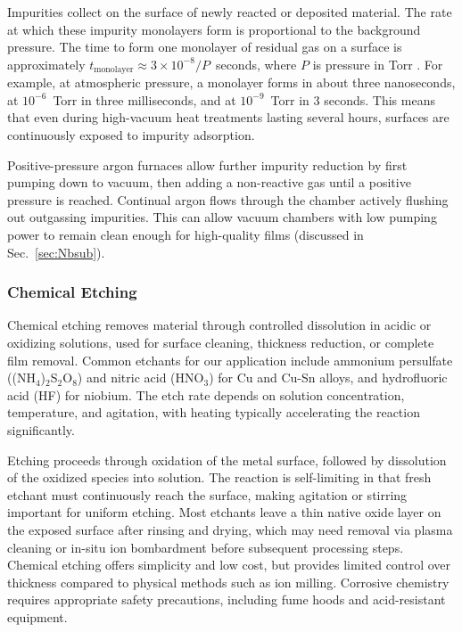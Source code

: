     Impurities collect on the surface of newly reacted or deposited material. The rate at which these impurity monolayers form is proportional to the background pressure. The time to form one monolayer of residual gas on a surface is approximately $t_\text{{monolayer}} \approx 3 \times 10^{-8}/P$~seconds, where $P$ is pressure in Torr \cite{ohringMaterialsScienceThin2002}. For example, at atmospheric pressure, a monolayer forms in about three nanoseconds, at $10^{-6}$~Torr in three milliseconds, and at $10^{-9}$~Torr in 3 seconds. This means that even during high-vacuum heat treatments lasting several hours, surfaces are continuously exposed to impurity adsorption. 
    
    Positive-pressure argon furnaces allow further impurity reduction by first pumping down to vacuum, then adding a non-reactive gas until a positive pressure is reached. Continual argon flows through the chamber actively flushing out outgassing impurities. This can allow vacuum chambers with low pumping power to remain clean enough for high-quality films (discussed in Sec.~\ref{sec:Nbsub}).
    
    \subsubsection{Chemical Etching}
    
    Chemical etching removes material through controlled dissolution in acidic or oxidizing solutions, used for surface cleaning, thickness reduction, or complete film removal. Common etchants for our application include ammonium persulfate ((NH$_4$)$_2$S$_2$O$_8$) and nitric acid (HNO$_3$) for Cu and Cu-Sn alloys, and hydrofluoric acid (HF) for niobium. The etch rate depends on solution concentration, temperature, and agitation, with heating typically accelerating the reaction significantly. 
    
    Etching proceeds through oxidation of the metal surface, followed by dissolution of the oxidized species into solution. The reaction is self-limiting in that fresh etchant must continuously reach the surface, making agitation or stirring important for uniform etching. Most etchants leave a thin native oxide layer on the exposed surface after rinsing and drying, which may need removal via plasma cleaning or in-situ ion bombardment before subsequent processing steps. Chemical etching offers simplicity and low cost, but provides limited control over thickness compared to physical methods such as ion milling. Corrosive chemistry requires appropriate safety precautions, including fume hoods and acid-resistant equipment.


